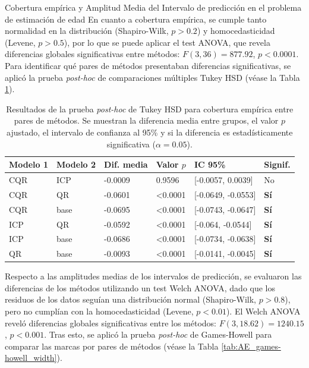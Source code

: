 \begin{StatisticsRef}{Cobertura empírica y Amplitud Media del Intervalo de predicción en el problema de estimación de edad}
%
En cuanto a cobertura empírica, se cumple tanto normalidad en la distribución (Shapiro-Wilk, $p>0.2$) y homocedasticidad (Levene, $p>0.5$), por lo que se puede aplicar el test ANOVA, que revela diferencias globales significativas entre métodos: $F(3,36)=877.92$, $p<0.0001$. Para identificar qué pares de métodos presentaban diferencias significativas, se aplicó la prueba \textit{post-hoc} de comparaciones múltiples Tukey HSD (véase la Tabla \ref{tab:AE_tukey_EC}).
%
\renewcommand{\arraystretch}{1.2}
\begin{table}[H]
    \small
    \centering
    \begin{tabular}{llllll}
    \toprule
    \textbf{Modelo 1} & \textbf{Modelo 2} & \textbf{Dif. media} & \textbf{Valor $p$} & \textbf{IC 95\%} & \textbf{Signif.} \\ \hline
    CQR & ICP & -0.0009 & 0.9596 & [-0.0057, 0.0039] & No \\
    CQR & QR & -0.0601 & \textless 0.0001 & [-0.0649, -0.0553] & \textbf{Sí} \\
    CQR & base & -0.0695 & \textless 0.0001 & [-0.0743, -0.0647] & \textbf{Sí} \\
    ICP & QR & -0.0592 & \textless 0.0001 & [-0.064, -0.0544] & \textbf{Sí} \\
    ICP & base & -0.0686 & \textless 0.0001 & [-0.0734, -0.0638] & \textbf{Sí} \\
    QR & base & -0.0093 & \textless 0.0001 & [-0.0141, -0.0045] & \textbf{Sí} \\
    \bottomrule
    \end{tabular}
    \caption[
        Problema de estimación de edad: 
        Resultados de la prueba \textit{post-hoc} de Tukey HSD para cobertura empírica entre pares de métodos.
    ]{
        Resultados de la prueba \textit{post-hoc} de Tukey HSD para cobertura empírica entre pares de métodos.
        Se muestran la diferencia media entre grupos, el valor $p$ ajustado, el intervalo de confianza al 95\% y si la diferencia es estadísticamente significativa ($\alpha = 0.05$).
    }
    \label{tab:AE_tukey_EC}
\end{table}
%
Respecto a las amplitudes medias de los intervalos de predicción, se evaluaron las diferencias de los métodos utilizando un test Welch ANOVA, dado que los residuos de los datos seguían una distribución normal (Shapiro-Wilk, $p>0.8$), pero no cumplían con la homocedasticidad (Levene, $p<0.01$). El Welch ANOVA reveló diferencias globales significativas entre los métodos: $F(3, 18.62) = 1240.15$, $p < 0.001$. Tras esto, se aplicó la prueba \textit{post-hoc} de Games-Howell para comparar las marcas por pares de métodos (véase la Tabla \ref{tab:AE_games-howell_width}).

\end{StatisticsRef}
